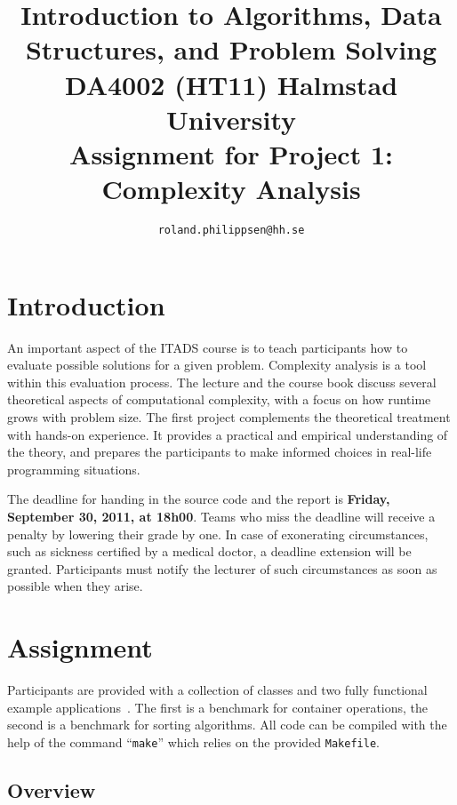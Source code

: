 \documentclass[a4paper,10pt]{article}
\begin{document}
\title{
  {\normalsize
    Introduction to Algorithms, Data Structures, and Problem Solving\\
    DA4002 (HT11) Halmstad University}\\
  Assignment for Project 1: Complexity Analysis\\
}
\author{
  \texttt{roland.philippsen@hh.se}
}
\maketitle



\section{Introduction}

An important aspect of the ITADS course is to teach participants how to evaluate possible solutions for a given problem.
Complexity analysis is a tool within this evaluation process.
The lecture and the course book discuss several theoretical aspects of computational complexity, with a focus on how runtime grows with problem size.
The first project complements the theoretical treatment with hands-on experience.
It provides a practical and empirical understanding of the theory, and prepares the participants to make informed choices in real-life programming situations.

The deadline for handing in the source code and the report is \textbf{Friday, September 30, 2011, at 18h00}.
Teams who miss the deadline will receive a penalty by lowering their grade by one.
In case of exonerating circumstances, such as sickness certified by a medical doctor, a deadline extension will be granted.
Participants must notify the lecturer of such circumstances as soon as possible when they arise.



\section{Assignment}

Participants are provided with a collection of classes and two fully functional example applications~\cite{itads-p1}.
The first is a benchmark for container operations, the second is a benchmark for sorting algorithms.
All code can be compiled with the help of the command ``\texttt{make}'' which relies on the provided \texttt{Makefile}.



\subsection{Overview}
\end{document}
